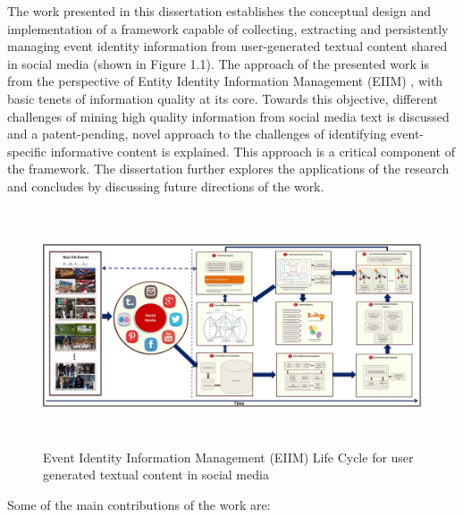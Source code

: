 The work presented in this dissertation establishes the conceptual design and implementation of a framework capable of collecting, extracting and persistently managing event identity information from user-generated textual content shared in social media (shown in Figure 1.1). The approach of the presented work is from the perspective of Entity Identity Information Management (EIIM) \cite{zhou2011entity}, with basic tenets of information quality at its core. Towards this objective, different challenges of mining high quality information from social media text is discussed and a patent-pending, novel approach to the challenges of identifying event-specific informative content is explained. This approach is a critical component of the framework. The dissertation further explores the applications of the research and concludes by discussing future directions of the work.



\begin{figure}[htbp]
\label{eiim}
  \caption{Event Identity Information Management (EIIM) Life Cycle for user generated textual content in social media}
  \centering
    \includegraphics[width=15.5cm,height=7cm]{Figures/EIIM.jpg}
\end{figure}

Some of the main contributions of the work are:

